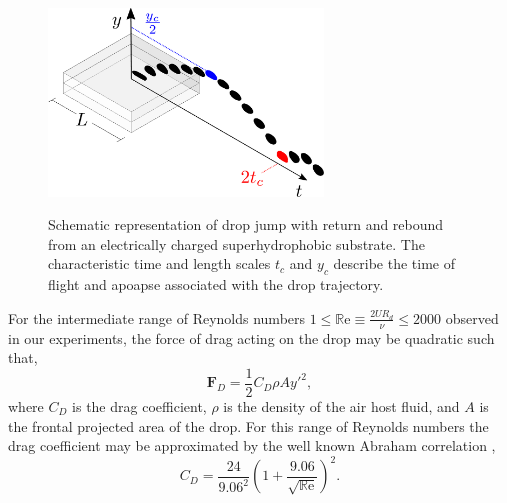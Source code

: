 \documentclass[12pt,a4paper,oneside]{book}
\begin{document}
\begin{figure}[ht]
\centering
\includegraphics[width=0.65\textwidth]{../figures/apparatus0.pdf}
\label{apparatus}
\caption{Schematic representation of drop jump with return and rebound from an electrically charged superhydrophobic substrate. The characteristic time and length scales $t_c$ and $y_c$ describe the time of flight and apoapse associated with the drop trajectory.}
\end{figure}

For the intermediate range of Reynolds numbers $1 \leq \mathbb{R}\mbox{e} \equiv \frac{2UR_d}{\nu} \leq 2000 $ observed in our experiments, the force of drag acting on the drop may be quadratic such that,
\begin{equation*}\label{drag_force}
\mathbf{F}_D = \frac{1}{2}C_D \rho A {y'}^2,
\end{equation*}
where $C_D$ is the drag coefficient, $\rho$ is the density of the air host fluid, and $A$ is the frontal projected area of the drop. For this range of Reynolds numbers the drag coefficient may be approximated by the well known Abraham correlation \cite{abraham_functional_1970},
\[C_D = \frac{24}{9.06^2} \left( 1 + \frac{9.06}{\sqrt{\mathbb{R}\mbox{e}}} \right)^2 .\]
\end{document}
